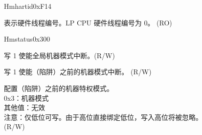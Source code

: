 \begin{register}{H}{mhartid}{0xF14}\label{regdesc:LPMHARTID}
%
\regnewline%
\begin{regdesc}\begin{reglist}
\label{fielddesc:LPMHARTID}\item [MHARTID] 表示硬件线程编号。LP CPU 硬件线程编号为 0。 (RO)
\end{reglist}\end{regdesc}
\end{register}

\begin{register}{H}{mstatus}{0x300}\label{regdesc:LPMSTATUS}
%
%
%
%
%
%
%
%
\regnewline%
\begin{regdesc}\begin{reglist}
\label{fielddesc:LPMSTATUSMIE}\item [MIE] 写 1 使能全局机器模式中断。(R/W)
\label{fielddesc:LPMSTATUSMPIE}\item [MPIE] 写 1 使能（陷阱）之前的机器模式中断。 (R/W)
\label{fielddesc:LPMSTATUSMPP}\item [MPP] 配置（陷阱）之前的机器特权模式。\\
0x3：机器模式\\
其他值：无效\\
注意：仅低位可写。由于高位直接绑定低位，写入高位将被忽略。\\
(R/W)
\end{reglist}\end{regdesc}
\end{register}

